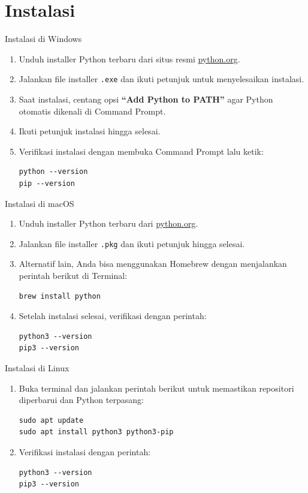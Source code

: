 \documentclass[aspectratio=169, table]{beamer}
\begin{document}
\section{Instalasi}
\begin{frame}[fragile]{Instalasi di Windows}
\begin{enumerate}
\item Unduh installer Python terbaru dari situs resmi \href{https://www.python.org/downloads/}{python.org}.
\item Jalankan file installer \texttt{.exe} dan ikuti petunjuk untuk menyelesaikan instalasi.
\item Saat instalasi, centang opsi \textbf{``Add Python to PATH''} agar Python otomatis dikenali di Command Prompt.
\item Ikuti petunjuk instalasi hingga selesai.
\item Verifikasi instalasi dengan membuka Command Prompt lalu ketik:
\begin{verbatim}
python --version
pip --version
\end{verbatim}
\end{enumerate}
\end{frame}

\begin{frame}[fragile]{Instalasi di macOS}
\begin{enumerate}
\item Unduh installer Python terbaru dari \href{https://www.python.org/downloads/macos/}{python.org}.
\item Jalankan file installer \texttt{.pkg} dan ikuti petunjuk hingga selesai.
\item Alternatif lain, Anda bisa menggunakan Homebrew dengan menjalankan perintah berikut di Terminal:
\begin{verbatim}
brew install python
\end{verbatim}
\item Setelah instalasi selesai, verifikasi dengan perintah:
\begin{verbatim}
python3 --version
pip3 --version
\end{verbatim}
\end{enumerate}
\end{frame}

\begin{frame}[fragile]{Instalasi di Linux}
\begin{enumerate}
\item Buka terminal dan jalankan perintah berikut untuk memastikan repositori diperbarui dan Python terpasang:
\begin{verbatim}
sudo apt update
sudo apt install python3 python3-pip
\end{verbatim}
\item Verifikasi instalasi dengan perintah:
\begin{verbatim}
python3 --version
pip3 --version
\end{verbatim}
\end{enumerate}
\end{frame}
\end{document}

